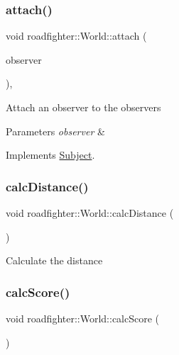 \subsubsection{\texorpdfstring{attach()}{attach()}}
{\footnotesize\ttfamily void roadfighter\+::\+World\+::attach (\begin{DoxyParamCaption}\item[{std\+::shared\+\_\+ptr$<$ \hyperlink{classObserver}{Observer} $>$}]{observer }\end{DoxyParamCaption})\hspace{0.3cm}{\ttfamily [override]}, {\ttfamily [virtual]}}

Attach an observer to the observers 
\begin{DoxyParams}{Parameters}
{\em observer} & \\
\hline
\end{DoxyParams}


Implements \hyperlink{classSubject_a6d3186b9f59f044f0c946be2b06606d7}{Subject}.

\mbox{\label{classroadfighter_1_1World_a3c7e82a028d7dde78186c404c3a728b9}} 
\subsubsection{\texorpdfstring{calc\+Distance()}{calcDistance()}}
{\footnotesize\ttfamily void roadfighter\+::\+World\+::calc\+Distance (\begin{DoxyParamCaption}{ }\end{DoxyParamCaption})}

Calculate the distance \mbox{\label{classroadfighter_1_1World_ad0e521ec14a1ddfacadd5c0b68908a00}} 
\subsubsection{\texorpdfstring{calc\+Score()}{calcScore()}}
{\footnotesize\ttfamily void roadfighter\+::\+World\+::calc\+Score (\begin{DoxyParamCaption}{ }\end{DoxyParamCaption})}

